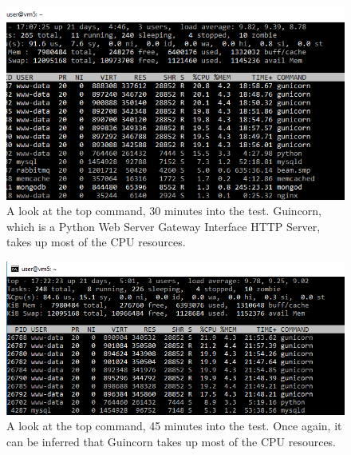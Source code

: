 \documentclass[12pt]{report}
\begin{document}
\newpage
\begin{figure}[h!]
	\centering
	\includegraphics[width=\textwidth,height=\textheight,keepaspectratio]{Downloads/EkalavyaSummerInternship2019/latex-template/intro/S2_new.png}\begin{center}
		
	\end{center}
	\caption{A look at the top command, 30 minutes into the test. Guincorn, which is a Python Web Server Gateway Interface HTTP Server, takes up most of the CPU resources. }
\end{figure}
\begin{figure}[h!]
	\centering
	\includegraphics[width=\textwidth,height=\textheight,keepaspectratio]{Downloads/EkalavyaSummerInternship2019/latex-template/intro/S3_new.png}
	\caption{A look at the top command, 45 minutes into the test. Once again, it can be inferred that Guincorn takes up most of the CPU resources.}
\end{figure}
\end{document}
